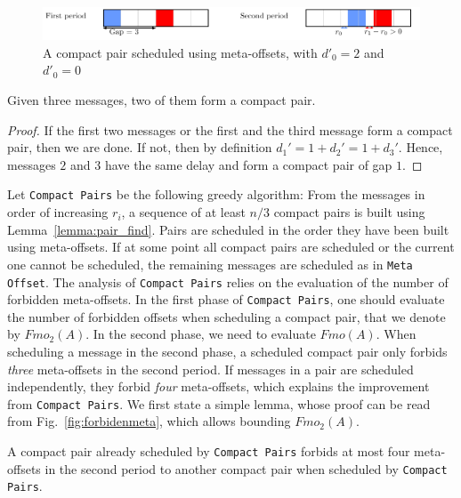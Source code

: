 \documentclass[a4paper,cleveref, autoref, thm-restate,UKenglish]{lipics-v2019}
\newcommand\compactpair{\texttt{Compact Pairs}\xspace}
\newcommand\metaoffset{\texttt{Meta Offset}\xspace}
\begin{document}
\begin{figure}[h]
\begin{center}

\includegraphics[scale=0.7]{compact_pair}
\end{center}
\caption{A compact pair scheduled using meta-offsets, with $d'_0 = 2$ and $d'_0 = 0$}
\label{fig:compactpair}
\end{figure}

\begin{lemma}\label{lemma:pair_find}
Given three messages, two of them form a compact pair. 
\end{lemma}
\begin{proof}
If the first two messages or the first and the third message form a compact pair,
then we are done. If not, then by definition $d_{1}' = 1 + d_{2}' = 1 + d_{3}'$. Hence, messages $2$ and $3$ have the same delay and form a compact pair of gap $1$.
\end{proof}

Let \compactpair be the following greedy algorithm: From the messages in order
of increasing $r_i$, a sequence of at least $n/3$ compact pairs is built using Lemma~\ref{lemma:pair_find}. Pairs are scheduled in the order they have been built using meta-offsets. If at some point all compact pairs are scheduled or the current one cannot be scheduled, the remaining messages are scheduled as in \metaoffset. The analysis of \compactpair relies on the evaluation of the number of forbidden meta-offsets. In the first phase of \compactpair, one should evaluate the number of forbidden offsets when scheduling a compact pair, that we denote by $Fmo_2(A)$. In the second phase, we need to evaluate $Fmo(A)$. When scheduling a message in the second phase, a scheduled compact pair only forbids \emph{three} meta-offsets in the second period. If messages in a pair are scheduled independently, they forbid \emph{four} meta-offsets, which explains the improvement from \compactpair. We first state a simple lemma, whose proof can be read from Fig.~\ref{fig:forbidenmeta}, which allows bounding $Fmo_2(A)$.

\begin{lemma}\label{lemma:pair_forbid}
A compact pair already scheduled by \compactpair forbids at most four meta-offsets in the second period to another compact pair when scheduled by \compactpair.
\end{lemma}
\end{document}
